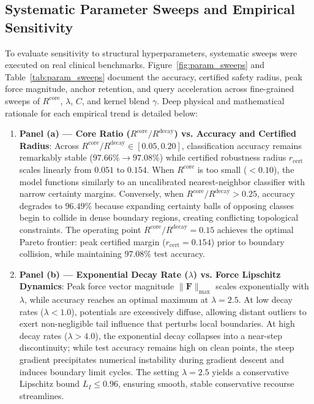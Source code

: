 \documentclass[preprint,review,12pt]{elsarticle}
\begin{document}
\subsection{Systematic Parameter Sweeps and Empirical Sensitivity}
\label{sec:sweeps}
To evaluate sensitivity to structural hyperparameters, systematic sweeps were executed on real clinical benchmarks. Figure~\ref{fig:param_sweeps} and Table~\ref{tab:param_sweeps} document the accuracy, certified safety radius, peak force magnitude, anchor retention, and query acceleration across fine-grained sweeps of $R^{\mathrm{core}}$, $\lambda$, $C$, and kernel blend $\gamma$. Deep physical and mathematical rationale for each empirical trend is detailed below:
\begin{enumerate}
    \item \textbf{Panel (a) --- Core Ratio ($R^{\mathrm{core}}/R^{\mathrm{decay}}$) vs. Accuracy and Certified Radius}: Across $R^{\mathrm{core}} / R^{\mathrm{decay}} \in [0.05, 0.20]$, classification accuracy remains remarkably stable ($97.66\% \to 97.08\%$) while certified robustness radius $r_{\mathrm{cert}}$ scales linearly from $0.051$ to $0.154$. When $R^{\mathrm{core}}$ is too small ($< 0.10$), the model functions similarly to an uncalibrated nearest-neighbor classifier with narrow certainty margins. Conversely, when $R^{\mathrm{core}} / R^{\mathrm{decay}} > 0.25$, accuracy degrades to $96.49\%$ because expanding certainty balls of opposing classes begin to collide in dense boundary regions, creating conflicting topological constraints. The operating point $R^{\mathrm{core}} / R^{\mathrm{decay}} = 0.15$ achieves the optimal Pareto frontier: peak certified margin ($r_{\mathrm{cert}} = 0.154$) prior to boundary collision, while maintaining $97.08\%$ test accuracy.
    \item \textbf{Panel (b) --- Exponential Decay Rate ($\lambda$) vs. Force Lipschitz Dynamics}: Peak force vector magnitude $\|\mathbf{F}\|_{\max}$ scales exponentially with $\lambda$, while accuracy reaches an optimal maximum at $\lambda = 2.5$. At low decay rates ($\lambda < 1.0$), potentials are excessively diffuse, allowing distant outliers to exert non-negligible tail influence that perturbs local boundaries. At high decay rates ($\lambda > 4.0$), the exponential decay collapses into a near-step discontinuity; while test accuracy remains high on clean points, the steep gradient precipitates numerical instability during gradient descent and induces boundary limit cycles. The setting $\lambda = 2.5$ yields a conservative Lipschitz bound $L_I \le 0.96$, ensuring smooth, stable conservative recourse streamlines.

\end{enumerate}
\end{document}
